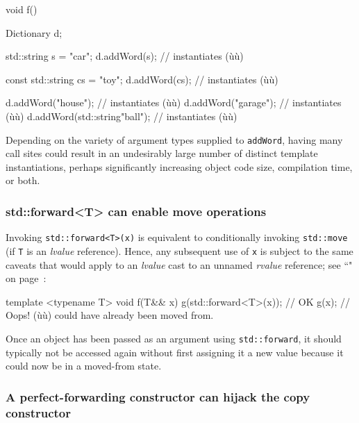 \begin{emcppslisting}
void f()
{
    Dictionary d;

    std::string s = "car";
    d.addWord(s);  // instantiates (ù{}ù)

    const std::string cs = "toy";
    d.addWord(cs);  // instantiates (ù{}ù)

    d.addWord("house");              // instantiates (ù{}ù)
    d.addWord("garage");             // instantiates (ù{}ù)
    d.addWord(std::string{"ball"});  // instantiates (ù{}ù)
}
\end{emcppslisting}

\noindent Depending on the variety of argument types supplied to \texttt{addWord},
having many call sites could result in an undesirably large number of
distinct template instantiations, perhaps significantly increasing
object code size, compilation time, or both.

\subsubsection[{\tt std::forward<T>} can enable move operations]{{\SubsubsecCode std::forward<T>} can enable move operations}\label{std::forward<t>-can-enable-move-operations}

Invoking \texttt{std::forward<T>(x)} is equivalent to conditionally
invoking \texttt{std::move} (if \texttt{T} is an
\emph{lvalue} reference). Hence, any subsequent use of \texttt{x} is
subject to the same caveats that would apply to an \emph{lvalue} cast to
an unnamed \emph{rvalue} reference; see ``" on page~\pageref{Rvalue-References}:

\begin{emcppslisting}
template <typename T>
void f(T&& x)
{
    g(std::forward<T>(x));  // OK
    g(x);                   // Oops! (ù{}ù) could have already been moved from.
}
\end{emcppslisting}

\noindent Once an object has been passed as an argument using
\texttt{std::forward}, it should typically not be accessed again
without first assigning it a new value because it could now be in a
moved-from state.

\subsubsection[A perfect-forwarding constructor can hijack the copy constructor]{A perfect-forwarding constructor can hijack the copy constructor}\label{a-perfect-forwarding-constructor-can-hijack-the-copy-constructor}

